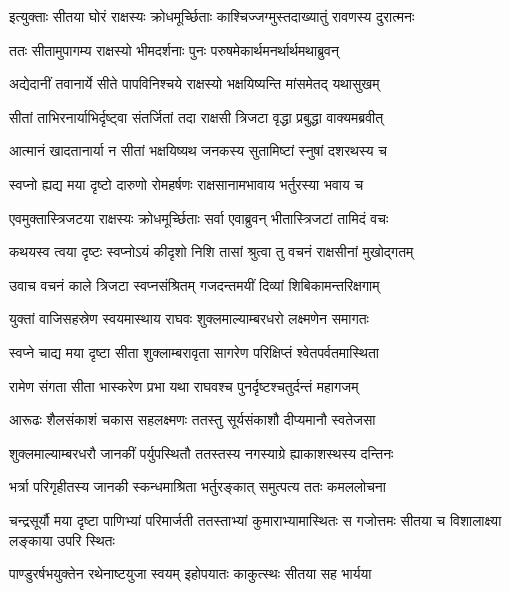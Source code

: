 
\twolineshloka
{इत्युक्ताः सीतया घोरं राक्षस्यः क्रोधमूर्च्छिताः}
{काश्चिज्जग्मुस्तदाख्यातुं रावणस्य दुरात्मनः} %

\twolineshloka
{ततः सीतामुपागम्य राक्षस्यो भीमदर्शनाः}
{पुनः परुषमेकार्थमनर्थार्थमथाब्रुवन्} %

\twolineshloka
{अद्येदानीं तवानार्ये सीते पापविनिश्चये}
{राक्षस्यो भक्षयिष्यन्ति मांसमेतद् यथासुखम्} %

\twolineshloka
{सीतां ताभिरनार्याभिर्दृष्ट्वा संतर्जितां तदा}
{राक्षसी त्रिजटा वृद्धा प्रबुद्धा वाक्यमब्रवीत्} %

\twolineshloka
{आत्मानं खादतानार्या न सीतां भक्षयिष्यथ}
{जनकस्य सुतामिष्टां स्नुषां दशरथस्य च} %

\twolineshloka
{स्वप्नो ह्यद्य मया दृष्टो दारुणो रोमहर्षणः}
{राक्षसानामभावाय भर्तुरस्या भवाय च} %

\twolineshloka
{एवमुक्तास्त्रिजटया राक्षस्यः क्रोधमूर्च्छिताः}
{सर्वा एवाब्रुवन् भीतास्त्रिजटां तामिदं वचः} %

\twolineshloka
{कथयस्व त्वया दृष्टः स्वप्नोऽयं कीदृशो निशि}
{तासां श्रुत्वा तु वचनं राक्षसीनां मुखोद्गतम्} %

\twolineshloka
{उवाच वचनं काले त्रिजटा स्वप्नसंश्रितम्}
{गजदन्तमयीं दिव्यां शिबिकामन्तरिक्षगाम्} %

\twolineshloka
{युक्तां वाजिसहस्रेण स्वयमास्थाय राघवः}
{शुक्लमाल्याम्बरधरो लक्ष्मणेन समागतः} %

\twolineshloka
{स्वप्ने चाद्य मया दृष्टा सीता शुक्लाम्बरावृता}
{सागरेण परिक्षिप्तं श्वेतपर्वतमास्थिता} %

\twolineshloka
{रामेण संगता सीता भास्करेण प्रभा यथा}
{राघवश्च पुनर्दृष्टश्चतुर्दन्तं महागजम्} %

\twolineshloka
{आरूढः शैलसंकाशं चकास सहलक्ष्मणः}
{ततस्तु सूर्यसंकाशौ दीप्यमानौ स्वतेजसा} %

\twolineshloka
{शुक्लमाल्याम्बरधरौ जानकीं पर्युपस्थितौ}
{ततस्तस्य नगस्याग्रे ह्याकाशस्थस्य दन्तिनः} %

\twolineshloka
{भर्त्रा परिगृहीतस्य जानकी स्कन्धमाश्रिता}
{भर्तुरङ्कात् समुत्पत्य ततः कमललोचना} %

\threelineshloka
{चन्द्रसूर्यौ मया दृष्टा पाणिभ्यां परिमार्जती}
{ततस्ताभ्यां कुमाराभ्यामास्थितः स गजोत्तमः}
{सीतया च विशालाक्ष्या लङ्काया उपरि स्थितः} %

\twolineshloka
{पाण्डुरर्षभयुक्तेन रथेनाष्टयुजा स्वयम्}
{इहोपयातः काकुत्स्थः सीतया सह भार्यया} %


